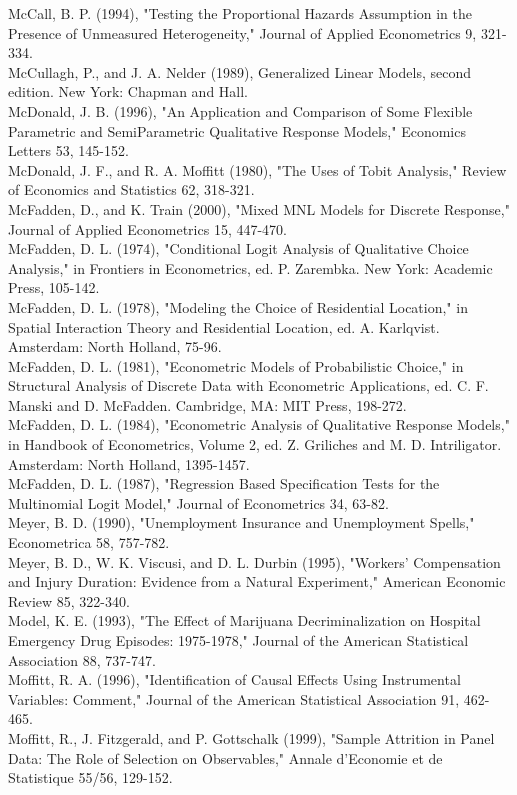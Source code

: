 \documentclass[10pt]{article}
\begin{document}
McCall, B. P. (1994), "Testing the Proportional Hazards Assumption in the Presence of Unmeasured Heterogeneity," Journal of Applied Econometrics 9, 321-334.\\
McCullagh, P., and J. A. Nelder (1989), Generalized Linear Models, second edition. New York: Chapman and Hall.\\
McDonald, J. B. (1996), "An Application and Comparison of Some Flexible Parametric and SemiParametric Qualitative Response Models," Economics Letters 53, 145-152.\\
McDonald, J. F., and R. A. Moffitt (1980), "The Uses of Tobit Analysis," Review of Economics and Statistics 62, 318-321.\\
McFadden, D., and K. Train (2000), "Mixed MNL Models for Discrete Response," Journal of Applied Econometrics 15, 447-470.\\
McFadden, D. L. (1974), "Conditional Logit Analysis of Qualitative Choice Analysis," in Frontiers in Econometrics, ed. P. Zarembka. New York: Academic Press, 105-142.\\
McFadden, D. L. (1978), "Modeling the Choice of Residential Location," in Spatial Interaction Theory and Residential Location, ed. A. Karlqvist. Amsterdam: North Holland, 75-96.\\
McFadden, D. L. (1981), "Econometric Models of Probabilistic Choice," in Structural Analysis of Discrete Data with Econometric Applications, ed. C. F. Manski and D. McFadden. Cambridge, MA: MIT Press, 198-272.\\
McFadden, D. L. (1984), "Econometric Analysis of Qualitative Response Models," in Handbook of Econometrics, Volume 2, ed. Z. Griliches and M. D. Intriligator. Amsterdam: North Holland, 1395-1457.\\
McFadden, D. L. (1987), "Regression Based Specification Tests for the Multinomial Logit Model," Journal of Econometrics 34, 63-82.\\
Meyer, B. D. (1990), "Unemployment Insurance and Unemployment Spells," Econometrica 58, 757-782.\\
Meyer, B. D., W. K. Viscusi, and D. L. Durbin (1995), "Workers' Compensation and Injury Duration: Evidence from a Natural Experiment," American Economic Review 85, 322-340.\\
Model, K. E. (1993), "The Effect of Marijuana Decriminalization on Hospital Emergency Drug Episodes: 1975-1978," Journal of the American Statistical Association 88, 737-747.\\
Moffitt, R. A. (1996), "Identification of Causal Effects Using Instrumental Variables: Comment," Journal of the American Statistical Association 91, 462-465.\\
Moffitt, R., J. Fitzgerald, and P. Gottschalk (1999), "Sample Attrition in Panel Data: The Role of Selection on Observables," Annale d'Economie et de Statistique 55/56, 129-152.
\end{document}
